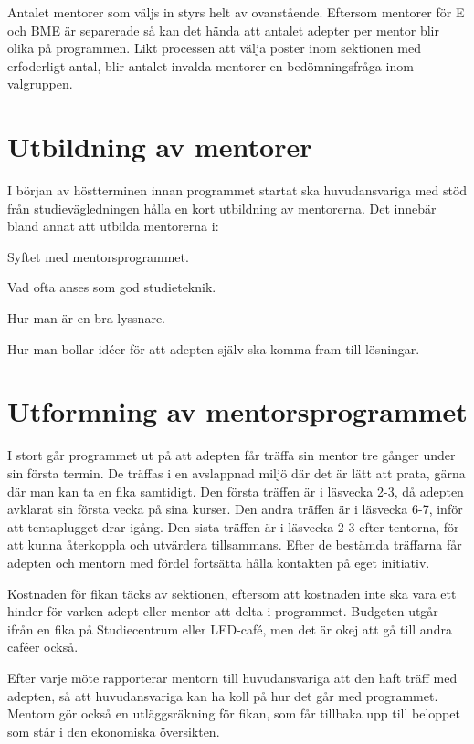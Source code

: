 \documentclass[10pt]{article}
\begin{document}
    Antalet mentorer som väljs in styrs helt av ovanstående. Eftersom mentorer för E och BME är separerade så kan det hända att antalet adepter per mentor blir olika på programmen. Likt processen att välja poster inom sektionen med erfoderligt antal, blir antalet invalda mentorer en bedömningsfråga inom valgruppen.

    \newpage

    \section{Utbildning av mentorer}
    I början av höstterminen innan programmet startat ska huvudansvariga med stöd från studievägledningen hålla en kort utbildning av mentorerna.
    Det innebär bland annat att utbilda mentorerna i:
    \begin{dashlist}
        \item Syftet med mentorsprogrammet.
        \item Vad ofta anses som god studieteknik.
        \item Hur man är en bra lyssnare.
        \item Hur man bollar idéer för att adepten själv ska komma fram till lösningar.
    \end{dashlist}

    \section{Utformning av mentorsprogrammet}
    I stort går programmet ut på att adepten får träffa sin mentor tre gånger under sin första termin.
    De träffas i en avslappnad miljö där det är lätt att prata, gärna där man kan ta en fika samtidigt.
    Den första träffen är i läsvecka 2-3, då adepten avklarat sin första vecka på sina kurser.
    Den andra träffen är i läsvecka 6-7, inför att tentaplugget drar igång.
    Den sista träffen är i läsvecka 2-3 efter tentorna, för att kunna återkoppla och utvärdera tillsammans.
    Efter de bestämda träffarna får adepten och mentorn med fördel fortsätta hålla kontakten på eget initiativ.

    Kostnaden för fikan täcks av sektionen, eftersom att kostnaden inte ska vara ett hinder för varken adept eller mentor att delta i programmet.
    Budgeten utgår ifrån en fika på Studiecentrum eller LED-café, men det är okej att gå till andra caféer också.

    Efter varje möte rapporterar mentorn till huvudansvariga att den haft träff med adepten, så att huvudansvariga kan ha koll på hur det går med programmet.
    Mentorn gör också en utläggsräkning för fikan, som får tillbaka upp till beloppet som står i den ekonomiska översikten.
\end{document}
